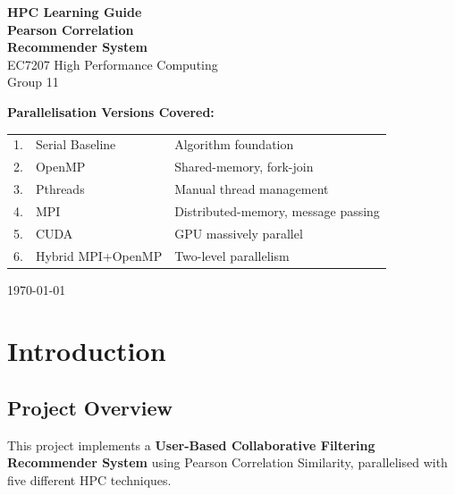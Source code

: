 \documentclass[12pt,a4paper]{report}
\begin{document}

\begin{titlepage}
\centering
\vspace*{3cm}
{\Huge\bfseries HPC Learning Guide\\[0.5em]
Pearson Correlation\\[0.2em]
Recommender System}\\[2em]
{\Large EC7207 High Performance Computing}\\[1em]
{\large Group 11}\\[3em]
\begin{tcolorbox}[colback=blue!5,colframe=blue!50,width=0.85\textwidth]
\centering
\textbf{Parallelisation Versions Covered:}\\[0.8em]
\begin{tabular}{lll}
1. & Serial Baseline & Algorithm foundation \\
2. & OpenMP & Shared-memory, fork-join \\
3. & Pthreads & Manual thread management \\
4. & MPI & Distributed-memory, message passing \\
5. & CUDA & GPU massively parallel \\
6. & Hybrid MPI+OpenMP & Two-level parallelism \\
\end{tabular}
\end{tcolorbox}
\vfill
{\large\today}
\end{titlepage}

\tableofcontents
\newpage

\chapter*{Introduction}

\section*{Project Overview}

This project implements a \textbf{User-Based Collaborative Filtering
Recommender System} using Pearson Correlation Similarity, parallelised with
five different HPC techniques.
\end{document}
